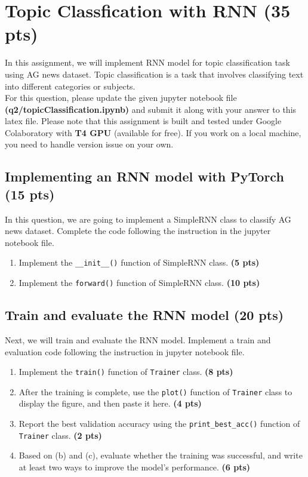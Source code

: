 \documentclass{assignment format}
\begin{document}
\section{Topic Classfication with RNN (35 pts)}

In this assignment, we will implement RNN model for topic classification task using AG news dataset. Topic classification is a task that involves classifying text into different categories or subjects.\\
For this question, please update the given jupyter notebook file \textbf{(q2/topicClassification.ipynb)} and submit it along with your answer to this latex file. Please note that this assignment is built and tested under Google Colaboratory with \textbf{T4 GPU }(available for free). If you work on a local machine, you need to handle version issue on your own. 

\subsection{Implementing an RNN model with PyTorch (15 pts)}
In this question, we are going to implement a SimpleRNN class to classify AG news dataset. Complete the code following the instruction in the jupyter notebook file.
\begin{enumerate}[label=(\alph*)]
    \item Implement the \texttt{\_\_init\_\_()} function of SimpleRNN class. \textbf{(5 pts)}
    \item Implement the \texttt{forward()} function of SimpleRNN class. \textbf{(10 pts)}
\end{enumerate}
\subsection{Train and evaluate the RNN model (20 pts)}
Next, we will train and evaluate the RNN model. Implement a train and evaluation code following the instruction in jupyter notebook file.
\begin{enumerate}[label=(\alph*)]
    \item Implement the \texttt{train()} function of \texttt{Trainer} class. \textbf{(8 pts)}
    \item After the training is complete, use the \texttt{plot()} function of \texttt{Trainer} class to display the figure, and then paste it here. \textbf{(4 pts)}
    \item Report the best validation accuracy using the \texttt{print\_best\_acc()} function of \texttt{Trainer} class. \textbf{(2 pts)}
    \item Based on (b) and (c), evaluate whether the training was successful, and write at least two ways to improve the model's performance. \textbf{(6 pts)}
\end{enumerate}
    
\end{document}
